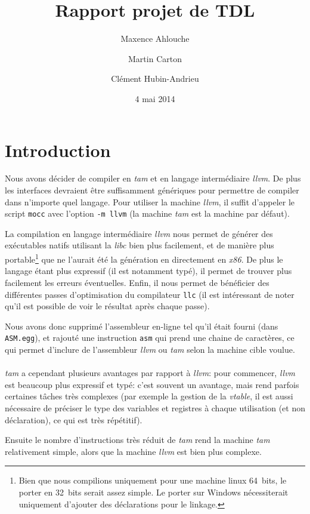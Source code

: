 \documentclass{scrartcl}
\title{Rapport projet de TDL}
\author{Maxence Ahlouche \and Martin Carton \and Clément Hubin-Andrieu}
\date{4 mai 2014}
\newcommand{\llvm}{\textit{llvm}}
\newcommand{\tam} {\textit{tam}}
\begin{document}
  \maketitle
  \tableofcontents
  \newpage

\section{Introduction}
  Nous avons décider de compiler en \tam{} et en langage intermédiaire \llvm{}.
  De plus les interfaces devraient être suffisamment génériques pour permettre
  de compiler dans n'importe quel langage. Pour utiliser la machine \llvm{}, il
  suffit d'appeler le script \texttt{mocc} avec l'option \verb+-m llvm+ (la
  machine \tam{} est la machine par défaut).

  La compilation en langage intermédiaire \llvm{} nous permet de générer des
  exécutables natifs utilisant la \textit{libc} bien plus facilement, et de
  manière plus portable\footnote{Bien que nous compilions uniquement pour une
  machine linux 64~bits, le porter en 32~bits serait assez simple. Le porter
  sur Windows nécessiterait uniquement d'ajouter des déclarations pour le
  linkage.} que ne l'aurait été la génération en directement en
  \textit{x86}. De plus le langage étant plus expressif (il est notamment typé),
  il permet de trouver plus facilement les erreurs éventuelles. Enfin, il nous
  permet de bénéficier des différentes passes d'optimisation du compilateur
  \verb+llc+ (il est intéressant de noter qu'il est possible de voir le
  résultat après chaque passe).

  Nous avons donc supprimé l'assembleur en-ligne tel qu'il était fourni (dans
  \verb+ASM.egg+), et rajouté une instruction \verb+asm+ qui prend une chaine
  de caractères, ce qui permet d'inclure de l'assembleur \llvm{} ou \tam{}
  selon la machine cible voulue.

  \paragraph{}
  \tam{} a cependant plusieurs avantages par rapport à \llvm{}: pour commencer,
  \llvm{} est beaucoup plus expressif et typé: c'est souvent un avantage, mais
  rend parfois certaines tâches très complexes (par exemple la gestion de la
  \textit{vtable}, il est aussi nécessaire de préciser le type des variables et
  registres à chaque utilisation (et non déclaration), ce qui est très
  répétitif).

  Ensuite le nombre d'instructions très réduit de \tam{} rend la machine \tam{}
  relativement simple, alors que la machine \llvm{} est bien plus complexe.
\end{document}
